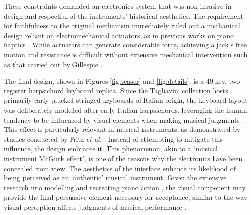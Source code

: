 These constraints demanded an electronics system that was non-invasive in design and respectful of the instruments' historical aesthetics. The requirement for faithfulness to the original mechanism immediately ruled out a mechanical design reliant on electromechanical actuators, as in previous works on piano haptics \cite{Timmermans2020,Gillespie1996}. 
While actuators can generate considerable force, achieving a jack's free motion and resistance is difficult without extensive mechanical intervention such as that carried out by Gillespie \cite{Gillespie1996}. 

The final design, shown in Figures \ref{fig:teaser} and \ref{fig:details}, is a 49-key, two-register harpsichord keyboard replica. Since the Tagliavini collection hosts primarily early plucked stringed keyboards of Italian origin, the keyboard layout was deliberately modelled after early Italian harpsichords, leveraging the human tendency to be influenced by visual elements when making musical judgments \cite{Tsay2013}. This effect is particularly relevant in musical instruments, as demonstrated by studies conducted by Fritz \emph{et al.} \cite{Fritz2012, Fritz2014, Fritz2017}. Instead of attempting to mitigate this influence, the design embraces it. This phenomenon, akin to a `musical instrument McGurk effect’, is one of the reasons why the electronics have been concealed from view. The aesthetics of the interface enhance its likelihood of being perceived as an `authentic' musical instrument. Given the extensive research into modelling and recreating piano action \cite{Cadoz1990, Gillespie1996, Timmermans2020}, the visual component may provide the final persuasive element necessary for acceptance, similar to the way visual perception affects judgments of musical performance \cite{Tsay2013}.

